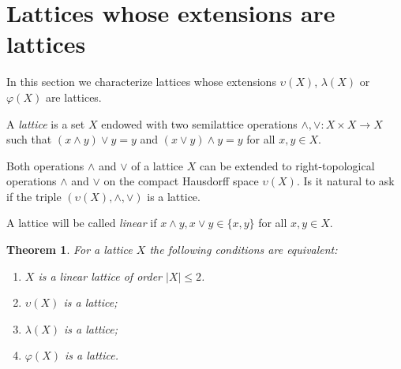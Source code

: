 \documentclass{amsart}
\newtheorem{theorem}[lem]{Theorem}
\theoremstyle{definition}
\begin{document}
\section{Lattices whose extensions are lattices}\label{s:lattice}

In this section we characterize lattices whose extensions ${\upsilon}(X)$, $\lambda(X)$ or $\varphi(X)$ are lattices.

A {\em lattice} is a set $X$ endowed with two semilattice operations $\wedge,\vee:X\times X\to X$ such that $(x\wedge y)\vee y=y$ and $(x\vee y)\wedge y=y$ for all $x,y\in X$.

Both operations $\wedge$ and $\vee$ of a lattice $X$ can be extended to right-topological operations $\wedge$ and $\vee$ on the compact Hausdorff space ${\upsilon}(X)$. Is it natural to ask if the triple $({\upsilon}(X),\wedge,\vee)$ is a lattice.

A lattice will be called {\em linear} if $x\wedge y,x\vee y\in\{x,y\}$ for all $x,y\in X$.

\begin{theorem} For a lattice $X$ the following conditions are equivalent:
\begin{enumerate}
\item $X$ is a linear lattice of order $|X|\le 2$.
\item ${\upsilon}(X)$ is a lattice;
\item $\lambda(X)$ is a lattice;
\item $\varphi(X)$ is a lattice.
\end{enumerate}
\end{theorem}
\end{document}
